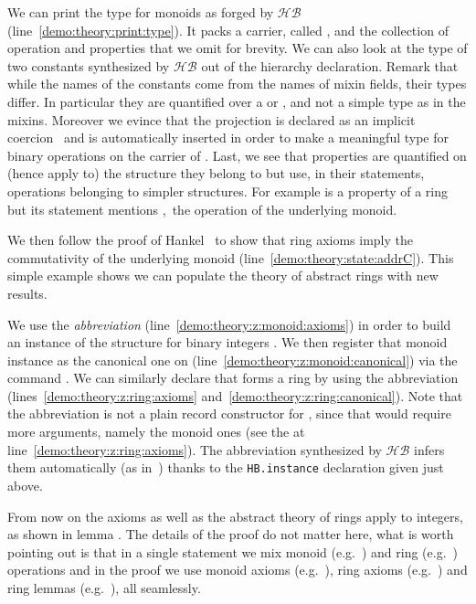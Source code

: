 \documentclass[a4paper,UKenglish,cleveref, autoref]{lipics-v2019}
\newcommand{\HB}{\ensuremath{\mathcal{HB}}}
\newcommand{\mixin}{mixin}
\newcommand{\mixins}{mixins}
\newcommand{\phantterm}{abbreviation}
\newcommand{\hbinstance}{{\tt\color{dkgreen}HB.instance}}
\theoremstyle{implem}
\theoremstyle{implem}
\theoremstyle{command}
\theoremstyle{commands}
\begin{document}
We can print the type for monoids as forged by \HB{} (line~\ref{demo:theory:print:type}).
It packs a carrier, called , and the collection of operation and
properties that we omit for brevity.  We can also look at the type of two
constants synthesized by \HB{} out of the hierarchy declaration. Remark that
while the names of the constants come from the names of \mixin{} fields,
their types differ.
In particular they are quantified over a  or ,
and not a simple type as in the \mixins{}. Moreover we evince that
the  projection is declared as an implicit coercion~\cite{Saibi97}
and is automatically inserted in order to make  a meaningful
type for binary operations on the carrier of . Last, we see that
properties are quantified on (hence apply to) the structure they belong to but
use, in their statements, operations belonging to simpler structures.
For example  is a property of a ring but  its statement mentions ,\
the operation of the underlying monoid.

We then follow the proof of Hankel~\cite{nearrings} to show that
ring axioms imply the commutativity of the underlying monoid
(line~\ref{demo:theory:state:addrC}). This simple example shows we can
populate the theory of abstract rings with new results.

We use the  \emph{\phantterm{}}
(line~\ref{demo:theory:z:monoid:axioms})
in order to build an instance of the 
structure for binary integers .
We then register that monoid instance as the canonical one on 
(line~\ref{demo:theory:z:monoid:canonical}) via the command
.
We can similarly declare that  forms a ring by using
the  \phantterm{}
(lines~\ref{demo:theory:z:ring:axioms} and~\ref{demo:theory:z:ring:canonical}).
Note that the \coq{Ring_of_Monoid.Build} \phantterm{} is not
a plain record constructor for , since that
would require more arguments, namely the monoid ones (see the \coq{_}
at line~\ref{demo:theory:z:ring:axioms}). The
\phantterm{} synthesized by \HB{} infers them automatically
(as in~\cite[Section 7]{DBLP:conf/itp/MahboubiT13}) thanks to the \hbinstance{}
declaration given just above.

From now on the axioms as well as the abstract theory of rings apply to
integers, as shown in lemma \coq{exercise}. The details of the proof
do not matter here, what is worth pointing out is that in a single
statement we mix monoid (e.g.~\coq{+}) and ring (e.g.~\coq{-}) operations and in the
proof we use monoid axioms (e.g.~\coq{addrA}), ring axioms
(e.g.~) and ring lemmas (e.g.~), all seamlessly.
\end{document}
